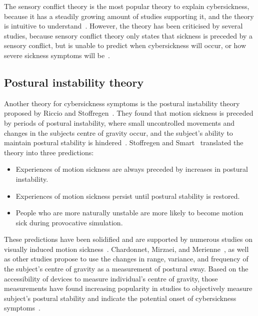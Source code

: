 The sensory conflict theory is the most popular theory to explain cybersickness, because it has a steadily growing
amount of studies supporting it, and the theory is intuitive to understand~\cite{Rebenitsch2016,Tiiro2018}.
However, the theory has been criticised by several studies, because sensory conflict theory only states that sickness
is preceded by a sensory conflict, but is unable to predict when cybersickness will occur, or how severe
sickness symptoms will be~\cite{LaViola2000,Rebenitsch2016,Kolasinski1995}.


\subsection{Postural instability theory}\label{subsec:postural-instability-theory}

Another theory for cybersickness symptoms is the postural instability theory proposed by Riccio and Stoffregen~\cite{Riccio1991}.
They found that motion sickness is preceded by periods of postural instability, where small uncontrolled movements and
changes in the subjects centre of gravity occur, and the subject's ability to maintain postural stability is
hindered~\cite{Riccio1991,Clifton2020}.
Stoffregen and Smart~\cite{Stoffregen1998} translated the theory into three predictions:
\begin{itemize}
    \item Experiences of motion sickness are always preceded by increases in postural instability.
    \item Experiences of motion sickness persist until postural stability is restored.
    \item People who are more naturally unstable are more likely to become motion sick during provocative simulation.
\end{itemize}
These predictions have been solidified and are supported by numerous studies on visually induced motion
sickness~\cite{Clifton2020}.
Chardonnet, Mirzaei, and Merienne~\cite{Chardonnet2015}, as well as other studies propose to use the changes in 
range, variance, and frequency of the subject's centre of gravity as a measurement of postural sway.
Based on the accessibility of devices to measure individual's centre of gravity, those measurements have found
increasing popularity in studies to objectively measure subject's postural stability and indicate the potential onset
of cybersickness symptoms~\cite{Lim2020}.
